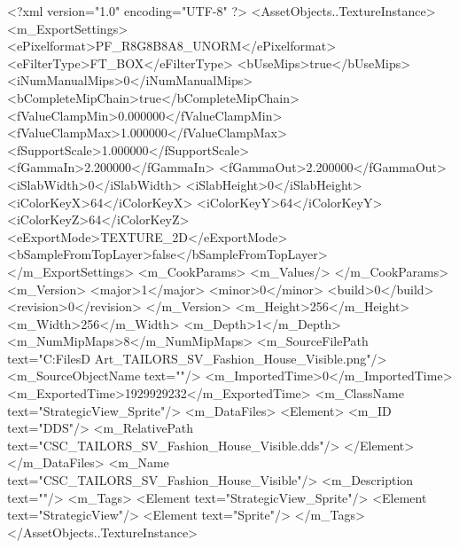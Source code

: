 <?xml version="1.0" encoding="UTF-8" ?>
<AssetObjects..TextureInstance>
	<m_ExportSettings>
		<ePixelformat>PF_R8G8B8A8_UNORM</ePixelformat>
		<eFilterType>FT_BOX</eFilterType>
		<bUseMips>true</bUseMips>
		<iNumManualMips>0</iNumManualMips>
		<bCompleteMipChain>true</bCompleteMipChain>
		<fValueClampMin>0.000000</fValueClampMin>
		<fValueClampMax>1.000000</fValueClampMax>
		<fSupportScale>1.000000</fSupportScale>
		<fGammaIn>2.200000</fGammaIn>
		<fGammaOut>2.200000</fGammaOut>
		<iSlabWidth>0</iSlabWidth>
		<iSlabHeight>0</iSlabHeight>
		<iColorKeyX>64</iColorKeyX>
		<iColorKeyY>64</iColorKeyY>
		<iColorKeyZ>64</iColorKeyZ>
		<eExportMode>TEXTURE_2D</eExportMode>
		<bSampleFromTopLayer>false</bSampleFromTopLayer>
	</m_ExportSettings>
	<m_CookParams>
		<m_Values/>
	</m_CookParams>
	<m_Version>
		<major>1</major>
		<minor>0</minor>
		<build>0</build>
		<revision>0</revision>
	</m_Version>
	<m_Height>256</m_Height>
	<m_Width>256</m_Width>
	<m_Depth>1</m_Depth>
	<m_NumMipMaps>8</m_NumMipMaps>
	<m_SourceFilePath text="C:\Users\Shadow\Desktop\Working Files\2D Art\Quarters\Tailors\StrategicView\CSC_TAILORS_SV_Fashion_House_Visible.png"/>
	<m_SourceObjectName text=""/>
	<m_ImportedTime>0</m_ImportedTime>
	<m_ExportedTime>1929929232</m_ExportedTime>
	<m_ClassName text="StrategicView_Sprite"/>
	<m_DataFiles>
		<Element>
			<m_ID text="DDS"/>
			<m_RelativePath text="CSC_TAILORS_SV_Fashion_House_Visible.dds"/>
		</Element>
	</m_DataFiles>
	<m_Name text="CSC_TAILORS_SV_Fashion_House_Visible"/>
	<m_Description text=""/>
	<m_Tags>
		<Element text="StrategicView_Sprite"/>
		<Element text="StrategicView"/>
		<Element text="Sprite"/>
	</m_Tags>
</AssetObjects..TextureInstance>

